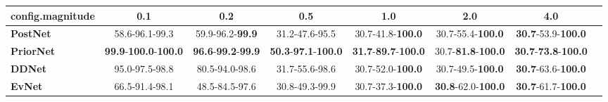 \begin{tabular}{lccccccc}
\toprule
\textbf{config.magnitude} &                                          0.1 &                                        0.2 &                                         0.5 &                                         1.0 &                                2.0 &                                         4.0 \\
\midrule
\textbf{PostNet } &                               58.6-96.1-99.3 &                    59.9-96.2-\textbf{99.9} &                              31.2-47.6-95.5 &                    30.7-41.8-\textbf{100.0} &           30.7-55.4-\textbf{100.0} &           \textbf{30.7}-53.9-\textbf{100.0} \\
\textbf{PriorNet} &  \textbf{99.9}-\textbf{100.0}-\textbf{100.0} &  \textbf{96.6}-\textbf{99.2}-\textbf{99.9} &  \textbf{50.3}-\textbf{97.1}-\textbf{100.0} &  \textbf{31.7}-\textbf{89.7}-\textbf{100.0} &  30.7-\textbf{81.8}-\textbf{100.0} &  \textbf{30.7}-\textbf{73.8}-\textbf{100.0} \\
\textbf{DDNet   } &                               95.0-97.5-98.8 &                             80.5-94.0-98.6 &                              31.7-55.6-98.6 &                    30.7-52.0-\textbf{100.0} &           30.7-49.5-\textbf{100.0} &           \textbf{30.7}-63.6-\textbf{100.0} \\
\textbf{EvNet   } &                               66.5-91.4-98.1 &                             48.5-84.5-97.6 &                              30.8-49.3-99.9 &                    30.7-37.3-\textbf{100.0} &  \textbf{30.8}-62.0-\textbf{100.0} &           \textbf{30.7}-61.7-\textbf{100.0} \\
\bottomrule
\end{tabular}
